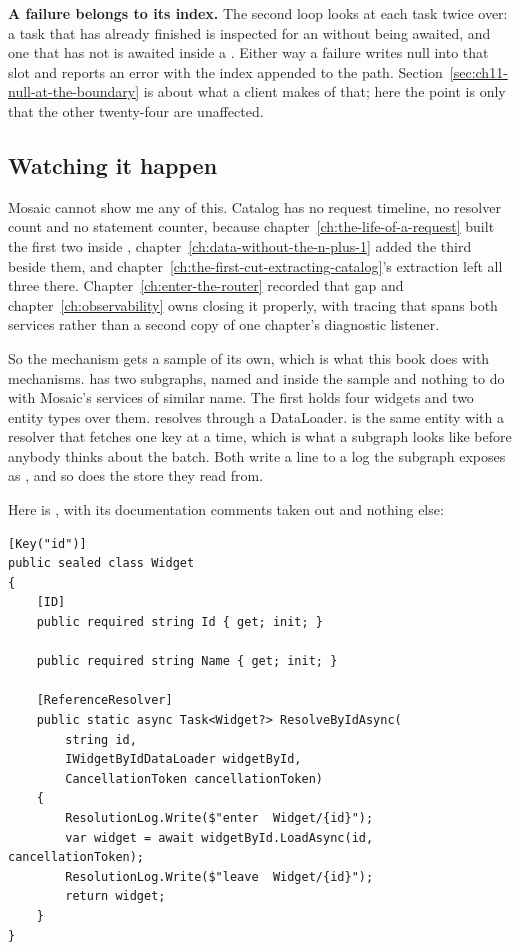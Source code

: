 \textbf{A failure belongs to its index.} The second loop looks at each task
twice over: a task that has already finished is inspected for an
 without being awaited, and one that has not is awaited inside
a . Either way a failure writes null into that slot and reports an
error with the index appended to the path.
Section~\ref{sec:ch11-null-at-the-boundary} is about what a client makes of
that; here the point is only that the other twenty-four are unaffected.

\subsection*{Watching it happen}

%
Mosaic cannot show me any of this. Catalog has no request timeline, no resolver
count and no statement counter, because
chapter~\ref{ch:the-life-of-a-request} built the first two inside
, chapter~\ref{ch:data-without-the-n-plus-1} added the third
beside them, and
chapter~\ref{ch:the-first-cut-extracting-catalog}'s extraction left all three
there. Chapter~\ref{ch:enter-the-router} recorded that gap and
chapter~\ref{ch:observability} owns closing it properly, with tracing that
spans both services rather than a second copy of one chapter's diagnostic
listener.

So the mechanism gets a sample of its own, which is what this book does with
mechanisms.  has two subgraphs, named
 and  inside the sample and nothing to do with
Mosaic's services of similar name. The first holds four widgets and two entity
types over them.  resolves through a DataLoader.  is
the same entity with a resolver that fetches one key at a time, which is what a
subgraph looks like before anybody thinks about the batch. Both write a line to
a log the subgraph exposes as , and so does the store
they read from.

Here is , with its documentation comments taken out and nothing
else:

\begin{verbatim}
[Key("id")]
public sealed class Widget
{
    [ID]
    public required string Id { get; init; }

    public required string Name { get; init; }

    [ReferenceResolver]
    public static async Task<Widget?> ResolveByIdAsync(
        string id,
        IWidgetByIdDataLoader widgetById,
        CancellationToken cancellationToken)
    {
        ResolutionLog.Write($"enter  Widget/{id}");
        var widget = await widgetById.LoadAsync(id, cancellationToken);
        ResolutionLog.Write($"leave  Widget/{id}");
        return widget;
    }
}
\end{verbatim}

